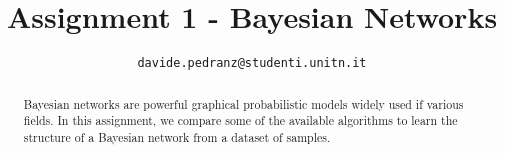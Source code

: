 \documentclass[conference]{IEEEtran}
\begin{document}
\title{Assignment 1 - Bayesian Networks}
\author{
	\texttt{davide.pedranz@studenti.unitn.it}
}

\maketitle

\begin{abstract}
Bayesian networks are powerful graphical probabilistic models widely used if various fields.
In this assignment, we compare some of the available algorithms to learn the structure of a Bayesian network from a dataset of samples.
\end{abstract}

\acresetall










% 
% 
\end{document}
